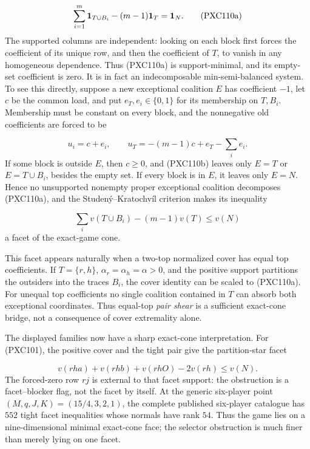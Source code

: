 \documentclass[11pt]{article}
\begin{document}
\begin{equation}
 \sum_{i=1}^m {\bf1}_{T\cup B_i}-(m-1){\bf1}_T={\bf1}_N.     \tag{PXC110a}
\end{equation}
The supported columns are independent: looking on each block first forces
the coefficient of its unique row, and then the coefficient of \(T\), to
vanish in any homogeneous dependence.  Thus (PXC110a) is support-minimal,
and its empty-set coefficient is zero.  It is in fact an indecomposable
min-semi-balanced system.  To see this directly, suppose a new exceptional
coalition \(E\) has coefficient \(-1\), let \(c\) be the common load, and put
\(e_T,e_i\in\{0,1\}\) for its membership on \(T,B_i\).  Membership must be
constant on every block, and the nonnegative old coefficients are forced to
be

\begin{equation}
 u_i=c+e_i,\qquad
 u_T=-(m-1)c+e_T-\sum_i e_i.                    \tag{PXC110b}
\end{equation}
If some block is outside \(E\), then \(c\ge0\), and (PXC110b) leaves only
\(E=T\) or \(E=T\cup B_i\), besides the empty set.  If every block is in
\(E\), it leaves only \(E=N\).  Hence no unsupported nonempty proper
exceptional coalition decomposes (PXC110a), and the
Studen\'y--Kratochv\'il criterion makes its inequality

\begin{equation}
 \sum_i v(T\cup B_i)-(m-1)v(T)\le v(N)             \tag{PXC110c}
\end{equation}
a facet of the exact-game cone.

This facet appears naturally when a two-top normalized cover has equal top
coefficients.  If \(T=\{r,h\}\),
\(\alpha_r=\alpha_h=\alpha>0\), and the positive support partitions the
outsiders into the traces \(B_i\), the cover identity can be scaled to
(PXC110a).  For unequal top coefficients no single coalition contained in
\(T\) can absorb both exceptional coordinates.  Thus equal-top
\emph{pair shear} is a sufficient exact-cone bridge, not a consequence of
cover extremality alone.

The displayed families now have a sharp exact-cone interpretation.  For
(PXC101), the positive cover and the tight pair give the partition-star
facet

\begin{equation}
 v(rha)+v(rhb)+v(rhO)-2v(rh)\le v(N).              \tag{PXC111a}
\end{equation}
The forced-zero row \(rj\) is external to that facet support: the obstruction
is a facet--blocker flag, not the facet by itself.  At the generic
six-player point \((M,q,J,K)=(15/4,3,2,1)\), the complete published
six-player catalogue has \(552\) tight facet inequalities whose normals have
rank \(54\).  Thus the game lies on a nine-dimensional minimal exact-cone
face; the selector obstruction is much finer than merely lying on one
facet.
\end{document}
